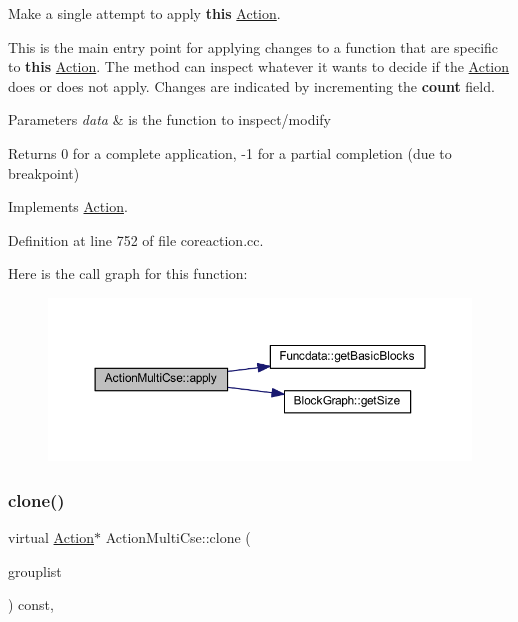 Make a single attempt to apply {\bfseries{this}} \mbox{\hyperlink{class_action}{Action}}. 

This is the main entry point for applying changes to a function that are specific to {\bfseries{this}} \mbox{\hyperlink{class_action}{Action}}. The method can inspect whatever it wants to decide if the \mbox{\hyperlink{class_action}{Action}} does or does not apply. Changes are indicated by incrementing the {\bfseries{count}} field. 
\begin{DoxyParams}{Parameters}
{\em data} & is the function to inspect/modify \\
\hline
\end{DoxyParams}
\begin{DoxyReturn}{Returns}
0 for a complete application, -\/1 for a partial completion (due to breakpoint) 
\end{DoxyReturn}


Implements \mbox{\hyperlink{class_action_aac1c3999d6c685b15f5d9765a4d04173}{Action}}.



Definition at line 752 of file coreaction.\+cc.

Here is the call graph for this function\+:
\nopagebreak
\begin{figure}[H]
\begin{center}
\leavevmode
\includegraphics[width=350pt]{class_action_multi_cse_a7a79627973a87279ddcadc497c516c2e_cgraph}
\end{center}
\end{figure}
\mbox{\label{class_action_multi_cse_a553b599fdf59ccb9c193740e7aabfc80}} 
\subsubsection{\texorpdfstring{clone()}{clone()}}
{\footnotesize\ttfamily virtual \mbox{\hyperlink{class_action}{Action}}$\ast$ Action\+Multi\+Cse\+::clone (\begin{DoxyParamCaption}\item[{const \mbox{\hyperlink{class_action_group_list}{Action\+Group\+List}} \&}]{grouplist }\end{DoxyParamCaption}) const\hspace{0.3cm}{\ttfamily [inline]}, {\ttfamily [virtual]}}



